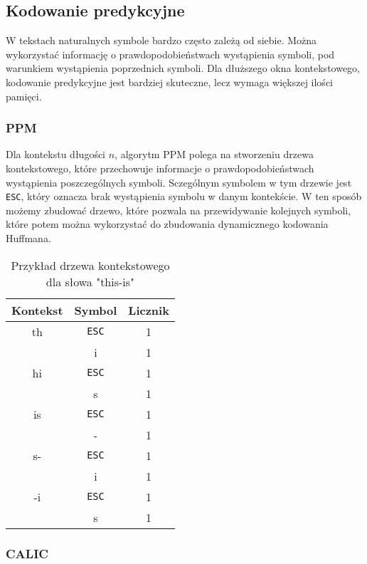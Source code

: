 \documentclass{../notatki}
\begin{document}
\subsection{Kodowanie predykcyjne}

W tekstach naturalnych symbole bardzo często zależą od siebie. Można wykorzystać
informację o prawdopodobieństwach wystąpienia symboli, pod warunkiem wystąpienia
poprzednich symboli. Dla dłuższego okna kontekstowego, kodowanie predykcyjne
jest bardziej skuteczne, lecz wymaga większej ilości pamięci.

\subsubsection{PPM}

Dla kontekstu długości $n$, algorytm PPM polega na stworzeniu drzewa
kontekstowego, które przechowuje informacje o prawdopodobieństwach wystąpienia
poszczególnych symboli. Sczególnym symbolem w tym drzewie jest \texttt{ESC},
który oznacza brak wystąpienia symbolu w danym kontekście. W ten sposób
możemy zbudować drzewo, które pozwala na przewidywanie kolejnych symboli,
które potem można wykorzystać do zbudowania dynamicznego kodowania Huffmana.

\begin{table*}[h]
  \centering
  \begin{tabular}{c|c|c}
    Kontekst & Symbol & Licznik \\
    \hline
    th & \texttt{ESC} & 1 \\
    & i & 1 \\
    \hline
    hi & \texttt{ESC} & 1 \\
    & s & 1 \\
    \hline
    is & \texttt{ESC} & 1 \\
    & - & 1 \\
    \hline
    s- & \texttt{ESC} & 1 \\
    & i & 1 \\
    \hline
    -i & \texttt{ESC} & 1 \\
    & s & 1 \\
  \end{tabular}
  \caption{Przykład drzewa kontekstowego dla słowa "this-is"}
\end{table*}

\subsubsection{CALIC}
\end{document}
